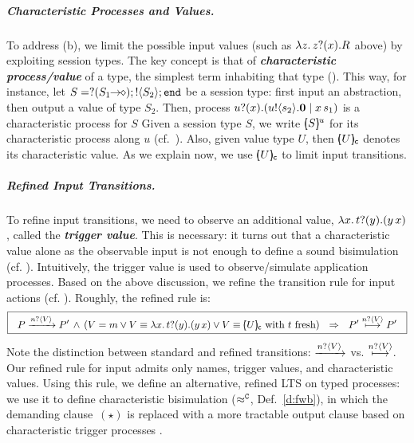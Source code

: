 \documentclass[a4paper,UKenglish]{lipics}
\theoremstyle{definition}
\begin{document}
\subparagraph{Characteristic Processes and Values.}
To address (b), we limit the possible 
input values (such as $\lambda z.\,z ? (x) . R$ above) %
by exploiting session types.
The key concept is that of {\bf \emph{characteristic process/value}}
of a type,  
the 
simplest term inhabiting that type ().
This way, for instance, let $S = ? (S_1\!\! \rightarrow\!\! \diamond) ; ! \langle S_2 \rangle ; \mathtt{end}$
be a session type: first
input an abstraction, %
then output a value of type $S_2$.
Then, process $u ? (x) . (u ! \langle s_2 \rangle . \mathbf{0} \;|\; x\, {s_1})$
is a characteristic process for $S$ 
Given a session type $S$, we write $[\!\!(S)\!\!]^{u} $
for its characteristic process along   $u$
(cf.~).
Also, %
given value type $U$, then
$[\!\!(U)\!\!]_{\mathsf{c}}$ denotes its characteristic value.
As we explain now, we use 
$[\!\!(U)\!\!]_{\mathsf{c}}$
 to limit input transitions.

\subparagraph{Refined Input Transitions.}
To refine  input transitions, we need to observe 
an additional value, 
$\lambda {x}.\,t ? (y) . (y\, {{x}})$, 
called the {\bf\em trigger value}. 
This is necessary: it turns out
that a characteristic value 
alone as the observable input 
is not enough to define a sound bisimulation (cf. ).
Intuitively, the trigger value is used
to observe/simulate application processes.
Based on the above discussion, we refine 
the transition rule for input actions (cf. ). 
Roughly, the 
refined
rule 
is:
$$
\boxed{
~~P \xrightarrow{n ? \langle V \rangle} P' \,\land\, (V = m \vee V \equiv \lambda {x}.\,t ? (y) . (y\, {{x}}) \vee  V \equiv [\!\!(U)\!\!]_{\mathsf{c}}  \textrm{ with } t \textrm{ fresh}) ~~\Rightarrow~~
P' \stackrel{n ? \langle V \rangle}{\longmapsto} P'~~}
$$
\noi
Note the distinction between standard and refined transitions: $\xrightarrow{n ? \langle V \rangle}$ vs. $\stackrel{n ? \langle V \rangle}{\longmapsto}$.
Our refined  rule for  input admits only names, trigger values, and characteristic values.
Using this rule, we define an alternative, refined  LTS on typed processes: 
we use it to define
characteristic  bisimulation 
($\approx^\mathtt{C}$, Def.~\ref{d:fwb}),
in which the demanding clause~$(\star)$ is replaced with 
a more tractable output clause based on 
characteristic 
trigger processes
.
\end{document}
